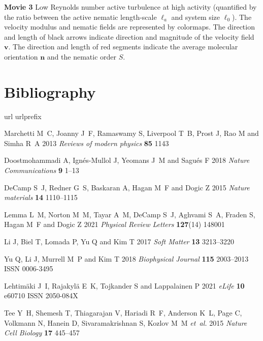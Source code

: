 \documentclass[12pt]{iopart}
\begin{document}
			\textbf{Movie 3} \quad	 Low Reynolds number active turbulence at high activity (quantified by the ratio between the active nematic length-scale $\ell_a$ and system size $\ell_0$).  The velocity modulus and nematic fields are represented by colormaps. The direction and length of black arrows indicate direction and magnitude of the velocity field $\bm{v}$. The direction and length of red segments indicate the average molecular orientation $\bm{n}$ and the nematic order $S$.
			
			\section*{Bibliography}
			
			\begin{thebibliography}{100}
			\expandafter\ifx\csname url\endcsname\relax
				\def\url#1{{\tt #1}}\fi
			\expandafter\ifx\csname urlprefix\endcsname\relax\def\urlprefix{URL }\fi
			\providecommand{\eprint}[2][]{\url{#2}}
				
				Marchetti M~C, Joanny J~F, Ramaswamy S, Liverpool T~B, Prost J, Rao M and Simha
				  R~A 2013 {\em Reviews of modern physics\/} {\bf 85} 1143
				
				Doostmohammadi A, Ign{\'e}s-Mullol J, Yeomans J~M and Sagu{\'e}s F 2018 {\em
				  Nature Communications\/} {\bf 9} 1--13
				
				DeCamp S~J, Redner G~S, Baskaran A, Hagan M~F and Dogic Z 2015 {\em Nature
				  materials\/} {\bf 14} 1110--1115
				
				Lemma L~M, Norton M~M, Tayar A~M, DeCamp S~J, Aghvami S~A, Fraden S, Hagan M~F
				  and Dogic Z 2021 {\em Physical Review Letters\/} {\bf 127}(14) 148001
				
				Li J, Biel T, Lomada P, Yu Q and Kim T 2017 {\em Soft Matter\/} {\bf 13}
				  3213--3220
				
				Yu Q, Li J, Murrell M~P and Kim T 2018 {\em Biophysical Journal\/} {\bf 115}
				  2003--2013 ISSN 0006-3495
				
				Lehtim{\"a}ki J~I, Rajakyl{\"a} E~K, Tojkander S and Lappalainen P 2021 {\em
				  eLife\/} {\bf 10} e60710 ISSN 2050-084X
				
				Tee Y~H, Shemesh T, Thiagarajan V, Hariadi R~F, Anderson K~L, Page C, Volkmann
				  N, Hanein D, Sivaramakrishnan S, Kozlov M~M {\em et~al.\/} 2015 {\em Nature
				  Cell Biology\/} {\bf 17} 445--457
				

\end{thebibliography}
\end{document}
